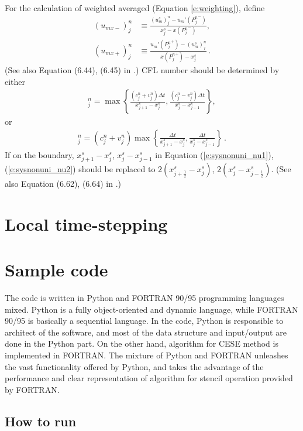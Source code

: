 \documentclass[letterpaper,12pt,dvips]{article}
\numberwithin{equation}{section}
\begin{document}
For the calculation of weighted averaged (Equation \ref{e:weighting}), 
define
\begin{align}
  (u_{mx-})_j^n &\equiv
    \frac{(u_m^s)_j^n-u_m'({P_j^n}^-)}{x_j^s-x({P_j^n}^-)}, \\
  (u_{mx+})_j^n &\equiv
    \frac{u_m'({P_j^n}^+)-(u_m^s)_j^n}{x({P_j^n}^+)-x_j^s}\,.
\end{align}
(See also Equation (6.44), (6.45) in \cite{b:chang08}.)
CFL number should be determined by either 
\begin{align}
  [\nu^{(1)}]_j^n = 
    \max\left\{
      \frac{(c_j^n+v_j^n)\Delta t}{x_{j+1}^s-x_j^s}, 
      \frac{(c_j^n-v_j^n)\Delta t}{x_j^s-x_{j-1}^s}
    \right\}, \label{e:sysnonuni_nu1}
\end{align}
or
\begin{align}
  [\nu^{(2)}]_j^n = 
    (c_j^n+v_j^n)\max\left\{
      \frac{\Delta t}{x_{j+1}^s-x_j^s}, 
      \frac{\Delta t}{x_j^s-x_{j-1}^s}
    \right\}\,. \label{e:sysnonuni_nu2}
\end{align}
If on the boundary, $x_{j+1}^s-x_j^s$, $x_j^s-x_{j-1}^s$ in Equation 
(\ref{e:sysnonuni_nu1}), (\ref{e:sysnonuni_nu2}) should be replaced to 
$2(x_{j+\frac{1}{2}}^s-x_j^s)$, $2(x_j^s-x_{j-\frac{1}{2}}^s)$.
(See also Equation (6.62), (6.64) in \cite{b:chang08}.)

\section{Local time-stepping}
\label{s:lts}

\section{Sample code}
\label{s:code}

The code is written in Python\cite{b:Python} and FORTRAN 90/95 
programming languages mixed.
Python is a fully object-oriented and dynamic language, while 
FORTRAN 90/95 is basically a sequential language.
In the code, Python is responsible to architect of the software, and 
most of the data structure and input/output are done in the Python part.
On the other hand, algorithm for CESE method is implemented in FORTRAN.
The mixture of Python and FORTRAN unleashes the vast functionality 
offered by Python, and takes the advantage of the performance and clear 
representation of algorithm for stencil operation provided by FORTRAN.

\subsection{How to run}
\end{document}
